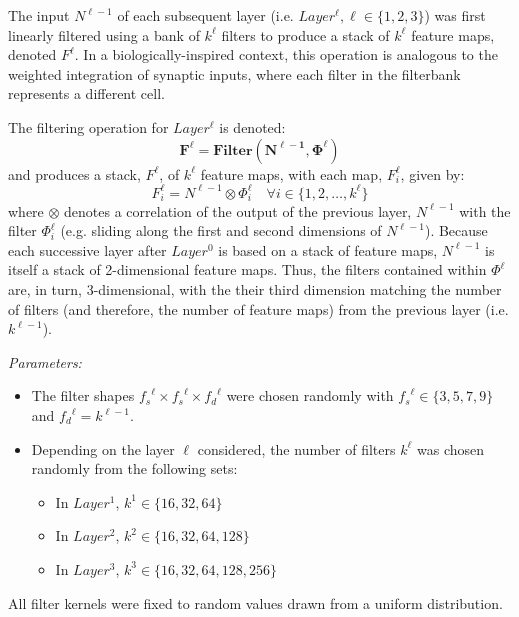 The input $N^{\ell-1}$ of each subsequent layer (i.e.  $Layer^{\ell}, \ell \in
\{1,2,3\}$) was first linearly filtered using a bank of $k^{\ell}$ filters to
produce a stack of $k^{\ell}$ feature maps, denoted $F^{\ell}$.  In a
biologically-inspired context, this operation is analogous to the weighted
integration of synaptic inputs, where each filter in the filterbank represents a
different cell.

The filtering operation for $Layer^{\ell}$ is denoted:
\begin{equation}
    \mathbf{F^{\ell} = Filter(N^{\ell-1}, \Phi^{\ell})}
\end{equation}
and produces a stack, $F^{\ell}$, of $k^{\ell}$ feature maps, with each map,
$F_{i}^{\ell}$, given by:
\begin{equation}\label{eq:filter}	
F^{\ell}_i = N^{\ell-1} \otimes \Phi^{\ell}_i \quad \forall i \in \{
1,2,\dotsc,k^{\ell} \}
\end{equation}
where $\otimes$ denotes a correlation of the output of the previous layer,
$N^{\ell-1}$ with the filter $\Phi^{\ell}_i$ (e.g. sliding along the first and
second dimensions of $N^{\ell-1}$).  Because each successive layer after
$Layer^{0}$ is based on a stack of feature maps, $N^{\ell-1}$ is itself a stack
of 2-dimensional feature maps.  Thus, the filters contained within $\Phi^{\ell}$
are, in turn, 3-dimensional, with the their third dimension matching the number
of filters (and therefore, the number of feature maps) from the previous layer
(i.e. $k^{\ell-1}$).

\emph{Parameters:}
\begin{itemize}
\item The filter shapes ${f_s}^{\ell} \times {f_s}^{\ell} \times {f_d}^{\ell}$
  were chosen randomly with ${f_s}^{\ell} \in \{3, 5, 7, 9\}$ and
  ${f_d}^{\ell}=k^{\ell-1}$.
\item Depending on the layer $\ell$ considered, the number of filters $k^{\ell}$
  was chosen randomly from the following sets:
\begin{itemize}
\item In $Layer^{1}$, $k^{1} \in \{16, 32, 64\}$
\item In $Layer^{2}$, $k^{2} \in \{16, 32, 64, 128\}$
\item In $Layer^{3}$, $k^{3} \in \{16, 32, 64, 128, 256\}$
\end{itemize}
\end{itemize}
All filter kernels were fixed to random values drawn from a uniform
distribution.


